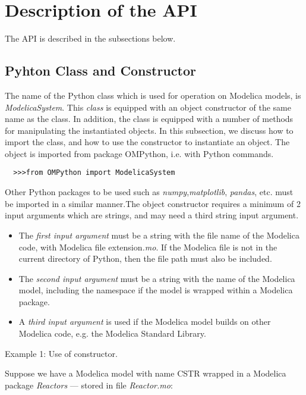 \section{Description of the API}
\label{sec:pythonapi}

The API is described in the subsections below.

\subsection{Pyhton Class and Constructor}
\label{subsec:pythonclass}

The name of the Python class which is used for operation on Modelica models, is \textit{ModelicaSystem}.
This \textit{class} is equipped with an object constructor of the same name as the class. In addition, the class is equipped
with a number of methods for manipulating the instantiated objects. In this subsection, we discuss how to import the class, and
how to use the constructor to instantiate an object. The object is imported from package OMPython, i.e. with
Python commands.

\begin{lstlisting}
  >>>from OMPython import ModelicaSystem
\end{lstlisting}

Other Python packages to be used such as \textit{numpy},\textit{matplotlib}, \textit{pandas}, etc. must be imported in a similar
manner.The object constructor requires a minimum of 2 input arguments which are strings, and may need a third string input
argument.

\begin{itemize}
	\item The \textit{first input argument} must be a string with the file name of the Modelica code, with Modelica file extension\textit{.mo}. If the 	 
	       Modelica file is not in the current directory of Python, then the file path must also be included.
	\item The \textit{second input argument} must be a string with the name of the Modelica model, including the namespace if the model is wrapped 
		  within a Modelica package.
	\item A \textit{third input argument} is used if the Modelica model builds on other Modelica code, e.g. the Modelica Standard Library.
\end{itemize}

Example 1: Use of constructor.

Suppose we have a Modelica model with name CSTR wrapped in a Modelica package \textit{Reactors} — stored in file
\textit{Reactor.mo}:

